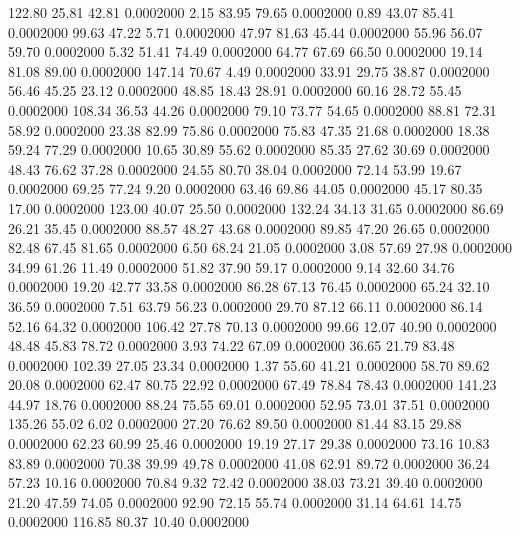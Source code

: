  122.80   25.81   42.81   0.0002000
   2.15   83.95   79.65   0.0002000
   0.89   43.07   85.41   0.0002000
  99.63   47.22    5.71   0.0002000
  47.97   81.63   45.44   0.0002000
  55.96   56.07   59.70   0.0002000
   5.32   51.41   74.49   0.0002000
  64.77   67.69   66.50   0.0002000
  19.14   81.08   89.00   0.0002000
 147.14   70.67    4.49   0.0002000
  33.91   29.75   38.87   0.0002000
  56.46   45.25   23.12   0.0002000
  48.85   18.43   28.91   0.0002000
  60.16   28.72   55.45   0.0002000
 108.34   36.53   44.26   0.0002000
  79.10   73.77   54.65   0.0002000
  88.81   72.31   58.92   0.0002000
  23.38   82.99   75.86   0.0002000
  75.83   47.35   21.68   0.0002000
  18.38   59.24   77.29   0.0002000
  10.65   30.89   55.62   0.0002000
  85.35   27.62   30.69   0.0002000
  48.43   76.62   37.28   0.0002000
  24.55   80.70   38.04   0.0002000
  72.14   53.99   19.67   0.0002000
  69.25   77.24    9.20   0.0002000
  63.46   69.86   44.05   0.0002000
  45.17   80.35   17.00   0.0002000
 123.00   40.07   25.50   0.0002000
 132.24   34.13   31.65   0.0002000
  86.69   26.21   35.45   0.0002000
  88.57   48.27   43.68   0.0002000
  89.85   47.20   26.65   0.0002000
  82.48   67.45   81.65   0.0002000
   6.50   68.24   21.05   0.0002000
   3.08   57.69   27.98   0.0002000
  34.99   61.26   11.49   0.0002000
  51.82   37.90   59.17   0.0002000
   9.14   32.60   34.76   0.0002000
  19.20   42.77   33.58   0.0002000
  86.28   67.13   76.45   0.0002000
  65.24   32.10   36.59   0.0002000
   7.51   63.79   56.23   0.0002000
  29.70   87.12   66.11   0.0002000
  86.14   52.16   64.32   0.0002000
 106.42   27.78   70.13   0.0002000
  99.66   12.07   40.90   0.0002000
  48.48   45.83   78.72   0.0002000
   3.93   74.22   67.09   0.0002000
  36.65   21.79   83.48   0.0002000
 102.39   27.05   23.34   0.0002000
   1.37   55.60   41.21   0.0002000
  58.70   89.62   20.08   0.0002000
  62.47   80.75   22.92   0.0002000
  67.49   78.84   78.43   0.0002000
 141.23   44.97   18.76   0.0002000
  88.24   75.55   69.01   0.0002000
  52.95   73.01   37.51   0.0002000
 135.26   55.02    6.02   0.0002000
  27.20   76.62   89.50   0.0002000
  81.44   83.15   29.88   0.0002000
  62.23   60.99   25.46   0.0002000
  19.19   27.17   29.38   0.0002000
  73.16   10.83   83.89   0.0002000
  70.38   39.99   49.78   0.0002000
  41.08   62.91   89.72   0.0002000
  36.24   57.23   10.16   0.0002000
  70.84    9.32   72.42   0.0002000
  38.03   73.21   39.40   0.0002000
  21.20   47.59   74.05   0.0002000
  92.90   72.15   55.74   0.0002000
  31.14   64.61   14.75   0.0002000
 116.85   80.37   10.40   0.0002000
